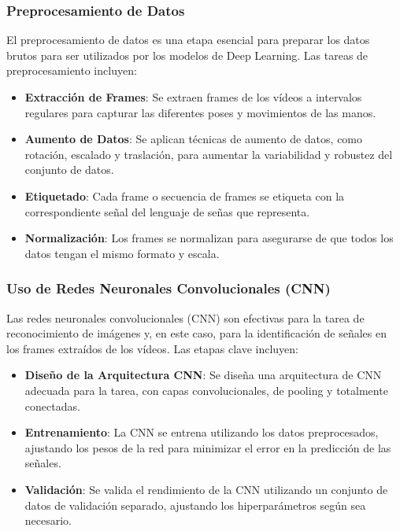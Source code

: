 \subsubsection{Preprocesamiento de Datos}
El preprocesamiento de datos es una etapa esencial para preparar los datos brutos para ser utilizados por los modelos de Deep Learning. Las tareas de preprocesamiento incluyen:
\begin{itemize}
	\item \textbf{Extracción de Frames}: Se extraen frames de los vídeos a intervalos regulares para capturar las diferentes poses y movimientos de las manos.
	\item \textbf{Aumento de Datos}: Se aplican técnicas de aumento de datos, como rotación, escalado y traslación, para aumentar la variabilidad y robustez del conjunto de datos.
	\item \textbf{Etiquetado}: Cada frame o secuencia de frames se etiqueta con la correspondiente señal del lenguaje de señas que representa.
	\item \textbf{Normalización}: Los frames se normalizan para asegurarse de que todos los datos tengan el mismo formato y escala.
\end{itemize}

\subsubsection{Uso de Redes Neuronales Convolucionales (CNN)}
Las redes neuronales convolucionales (CNN) son efectivas para la tarea de reconocimiento de imágenes y, en este caso, para la identificación de señales en los frames extraídos de los vídeos. Las etapas clave incluyen:
\begin{itemize}
	\item \textbf{Diseño de la Arquitectura CNN}: Se diseña una arquitectura de CNN adecuada para la tarea, con capas convolucionales, de pooling y totalmente conectadas.
	\item \textbf{Entrenamiento}: La CNN se entrena utilizando los datos preprocesados, ajustando los pesos de la red para minimizar el error en la predicción de las señales.
	\item \textbf{Validación}: Se valida el rendimiento de la CNN utilizando un conjunto de datos de validación separado, ajustando los hiperparámetros según sea necesario.
\end{itemize}

